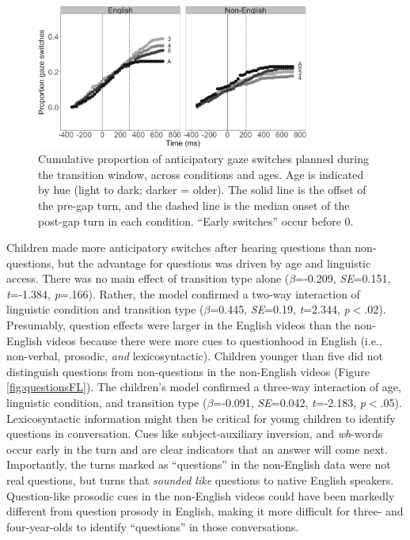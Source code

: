 \documentclass[authoryear, 12pt]{elsarticle}
\begin{document}
\begin{figure}[t]
\begin{center}
\includegraphics[width=0.8\textwidth]{figures/FIG-cumulative-FL.png}
\end{center}
\caption{Cumulative proportion of anticipatory gaze switches planned during the transition window, across conditions and ages. Age is indicated by hue (light to dark; darker = older). The solid line is the offset of the pre-gap turn, and the dashed line is the median onset of the post-gap turn in each condition. ``Early switches'' occur before 0.} 
\label{fig:cumulativeFL}
\end{figure}

Children made more anticipatory switches after hearing questions than non-questions, but the advantage for questions was driven by age and linguistic access. There was no main effect of transition type alone (\textit{$\beta$}=-0.209, \textit{SE}=0.151, \textit{t}=-1.384, \textit{p}=.166). Rather, the model confirmed a two-way interaction of linguistic condition and transition type (\textit{$\beta$}=0.445, \textit{SE}=0.19, \textit{t}=2.344, \textit{p}$<$.02). Presumably, question effects were larger in the English videos than the non-English videos because there were more cues to questionhood in English (i.e., non-verbal, prosodic, \textit{and} lexicosyntactic). Children younger than five did not distinguish questions from non-questions in the non-English videos (Figure \ref{fig:questionsFL}). The children's model confirmed a three-way interaction of age, linguistic condition, and transition type (\textit{$\beta$}=-0.091, \textit{SE}=0.042, \textit{t}=-2.183, \textit{p}$<$.05). Lexicosyntactic information might then be critical for young children to identify questions in conversation. Cues like subject-auxiliary inversion, and \textit{wh}-words occur early in the turn and are clear indicators that an answer will come next. Importantly, the turns marked as ``questions'' in the non-English data were not real questions, but turns that \textit{sounded like} questions to native English speakers. Question-like prosodic cues in the non-English videos could have been markedly different from question prosody in English, making it more difficult for three- and four-year-olds to identify ``questions'' in those conversations.
\end{document}
